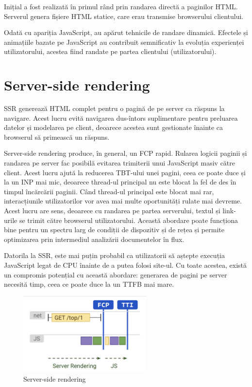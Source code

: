 \documentclass[12pt, a4paper]{report}
\begin{document}
Inițial a fost realizată în primul rând prin randarea directă a paginilor HTML. Serverul genera fișiere HTML statice, care erau transmise browserului clientului.

Odată cu apariția JavaScript, au apărut tehnicile de randare dinamică. Efectele și animațiile bazate pe JavaScript au contribuit semnificativ la evoluția experienței utilizatorului, acestea fiind randate pe partea clientului (utilizatorului).

\section{Server-side rendering}

SSR generează HTML complet pentru o pagină de pe server ca răspuns la navigare. Acest lucru evită navigarea dus-întors suplimentare pentru preluarea datelor și modelarea pe client, deoarece acestea sunt gestionate înainte ca browserul să primească un răspuns.

Server-side rendering produce, în general, un FCP rapid. Rularea logicii paginii și randarea pe server fac posibilă evitarea trimiterii unui JavaScript masiv către client. Acest lucru ajută la reducerea TBT-ului unei pagini, ceea ce poate duce și la un INP mai mic, deoarece thread-ul principal nu este blocat la fel de des în timpul încărcării paginii. Când thread-ul principal este blocat mai rar, interacțiunile utilizatorilor vor avea mai multe oportunități rulate mai devreme. Acest lucru are sens, deoarece cu randarea pe partea serverului, textul și link-urile se trimit către browserul utilizatorului. Această abordare poate funcționa bine pentru un spectru larg de condiții de dispozitiv și de rețea și permite optimizarea prin intermediul analizării documentelor în flux.

Datorila la SSR, este mai puțin probabil ca utilizatorii să aștepte execuția JavaScript legat de CPU înainte de a putea folosi site-ul. Cu toate acestea, există un compromis potențial cu această abordare: generarea de pagini pe server necesită timp, ceea ce poate duce la un TTFB mai mare.

\begin{figure}[htbp]
	\centering
	\includegraphics[width=0.6\textwidth]{ssr.png}
	\caption{Server-side rendering}
	\label{fig:ssr}
\end{figure}
\end{document}
